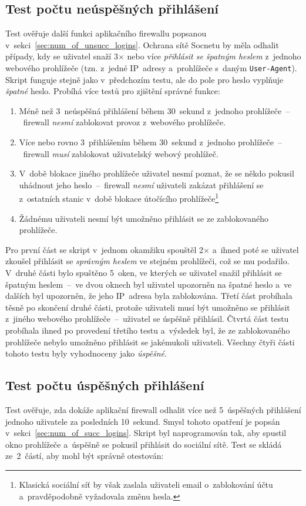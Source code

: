 \subsection*{Test počtu neúspěšných přihlášení}
Test ověřuje další funkci aplikačního firewallu popsanou v~sekci~\ref{sec:num_of_unsucc_logins}. Ochrana sítě Socnetu by měla odhalit případy, kdy se uživatel snaží 3$\times$ nebo více \textit{přihlásit se špatným heslem} z~jednoho webového prohlížeče (tzn. z~jedné IP~adresy a~prohlížeče s~daným \texttt{User-Agent}). Skript funguje stejně jako v~předchozím testu, ale do pole pro heslo vyplňuje \textit{špatné} heslo. Probíhá více testů pro zjištění správné funkce:

\begin{enumerate}
  \item Méně než 3~neúspěšná přihlášení během 30~sekund z~jednoho prohlížeče~--~firewall \textit{nesmí} zablokovat provoz z~webového prohlížeče.
  \item Více nebo rovno 3~přihlášením během 30~sekund z~jednoho prohlížeče~--~firewall \textit{musí} zablokovat uživatelský webový prohlížeč.
  \item V~době blokace jiného prohlížeče uživatel nesmí poznat, že se někdo pokusil uhádnout jeho heslo~--~firewall \textit{nesmí} uživateli zakázat přihlášení se z~ostatních stanic v~době blokace útočícího prohlížeče\footnote{Klasická sociální síť by však zaslala uživateli email o~zablokování účtu a~pravděpodobně vyžadovala změnu hesla.}
  \item Žádnému uživateli nesmí být umožněno přihlásit se ze zablokovaného prohlížeče.
\end{enumerate}

\noindent
Pro první část se skript v~jednom okamžiku spouštěl 2$\times$ a~ihned poté se uživatel zkoušel přihlásit se \textit{správným heslem} ve stejném prohlížeči, což se mu podařilo. V~druhé části bylo spuštěno 5~oken, ve kterých se uživatel snažil přihlásit se špatným heslem~--~ve dvou oknech byl uživatel upozorněn na špatné heslo a~ve dalších byl upozorněn, že jeho IP~adresa byla zablokována. Třetí část probíhala těsně po skončení druhé části, protože uživateli musí být umožněno se přihlásit z~jiného webového prohlížeče~--~uživatel se úspěšně přihlásil. Čtvrtá část testu probíhala ihned po provedení třetího testu a~výsledek byl, že ze zablokovaného prohlížeče nebylo umožněno přihlásit se jakémukoli uživateli. Všechny čtyři části tohoto testu byly vyhodnoceny jako \textit{úspěšné}.

\subsection*{Test počtu úspěšných přihlášení}
Test ověřuje, zda dokáže aplikační firewall odhalit více než 5~úspěšných přihlášení jednoho uživatele za posledních 10~sekund. Smysl tohoto opatření je popsán v~sekci~\ref{sec:num_of_succ_logins}. Skript byl naprogramován tak, aby spustil okno prohlížeče a~úspěšně se pokusil přihlásit do sociální sítě. Test se skládá ze~2~částí, aby mohl být správně otestován:

